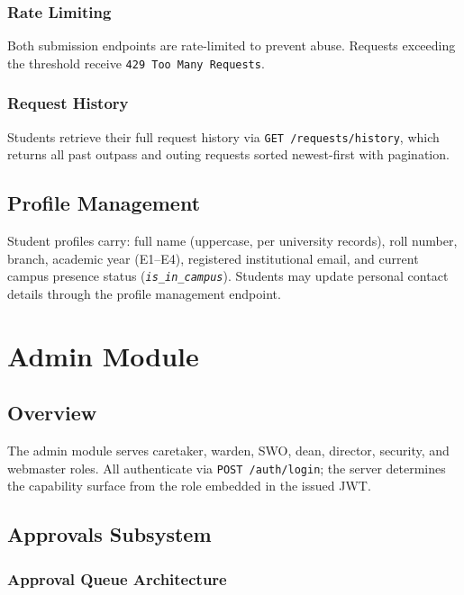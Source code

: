 \documentclass[12pt,a4paper]{report}
\newcommand{\api}[1]{\texttt{\small #1}}
\newcommand{\field}[1]{\texttt{\textit{#1}}}
\newcommand{\code}[1]{\texttt{#1}}
\begin{document}
\subsection{Rate Limiting}

Both submission endpoints are rate-limited to prevent abuse. Requests exceeding the threshold receive \code{429 Too Many Requests}.

\subsection{Request History}

Students retrieve their full request history via \api{GET /requests/history}, which returns all past outpass and outing requests sorted newest-first with pagination.

\section{Profile Management}

Student profiles carry: full name (uppercase, per university records), roll number, branch, academic year (E1--E4), registered institutional email, and current campus presence status (\field{is\_in\_campus}). Students may update personal contact details through the profile management endpoint.

\chapter{Admin Module}

\section{Overview}

The admin module serves caretaker, warden, SWO, dean, director, security, and webmaster roles. All authenticate via \api{POST /auth/login}; the server determines the capability surface from the role embedded in the issued JWT.

\section{Approvals Subsystem}

\subsection{Approval Queue Architecture}
\end{document}
